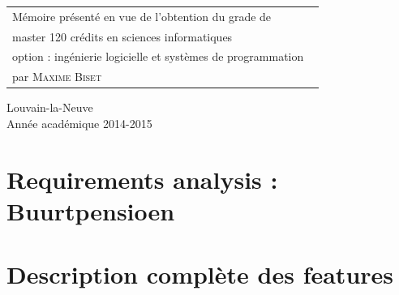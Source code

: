 \documentclass[british]{article}
\newcommand\name{\textsc{Maxime Biset}}
\newcommand\years{2014-2015}
\begin{document}
\begin{minipage}{.5\textwidth}
\begin{tabular}{l}
Mémoire présenté en vue de l'obtention du grade de
\\ master 120 crédits en sciences informatiques
\\ option : ingénierie logicielle et systèmes de programmation \
\\ par \name \
\end{tabular}
\end{minipage}
\vfill
\begin{center}
Louvain-la-Neuve
\\ Année académique \years
\end{center}


\appendix

\section{Requirements analysis : Buurtpensioen}


\section{Description complète des features}

\end{document}
